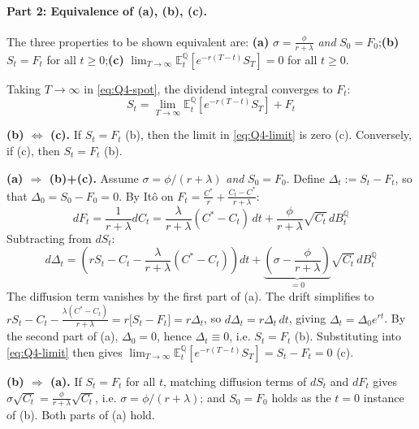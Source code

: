 \documentclass[12pt,a4paper]{article}
\begin{document}
\paragraph{Part 2: Equivalence of (a), (b), (c).}
The three properties to be shown equivalent are: \textbf{(a)} $\sigma = \frac{\phi}{r+\lambda}$ \emph{and} $S_0 = F_0$;\quad \textbf{(b)} $S_t = F_t$ for all $t \geq 0$;\quad \textbf{(c)} $\lim_{T\to\infty}\mathbb{E}^{\mathbb{Q}}_t[e^{-r(T-t)}S_T] = 0$ for all $t \geq 0$.

Taking $T \to \infty$ in \eqref{eq:Q4-spot}, the dividend integral converges to $F_t$:
\begin{equation}
    S_t = \lim_{T \to \infty} \mathbb{E}^{\mathbb{Q}}_t\!\left[ e^{-r(T-t)} S_T \right] + F_t \label{eq:Q4-limit}
\end{equation}

\noindent\textbf{(b) $\Leftrightarrow$ (c).} If $S_t = F_t$ (b), then the limit in \eqref{eq:Q4-limit} is zero (c). Conversely, if (c), then $S_t = F_t$ (b).

\noindent\textbf{(a) $\Rightarrow$ (b)+(c).} Assume $\sigma = \phi/(r+\lambda)$ \emph{and} $S_0 = F_0$. Define $\Delta_t := S_t - F_t$, so that $\Delta_0 = S_0 - F_0 = 0$. By Itô on $F_t = \frac{C^*}{r} + \frac{C_t - C^*}{r+\lambda}$:
\begin{equation*}
    dF_t = \frac{1}{r+\lambda}dC_t = \frac{\lambda}{r+\lambda}(C^* - C_t)\,dt + \frac{\phi}{r+\lambda}\sqrt{C_t}\,dB^{\mathbb{Q}}_t
\end{equation*}
Subtracting from $dS_t$:
\begin{equation*}
    d\Delta_t = \left(rS_t - C_t - \frac{\lambda}{r+\lambda}(C^* - C_t)\right)dt + \underbrace{\left(\sigma - \frac{\phi}{r+\lambda}\right)}_{=0}\sqrt{C_t}\,dB^{\mathbb{Q}}_t
\end{equation*}
The diffusion term vanishes by the first part of (a). The drift simplifies to $rS_t - C_t - \frac{\lambda(C^*-C_t)}{r+\lambda} = r\big[S_t - F_t\big] = r\Delta_t$, so $d\Delta_t = r\Delta_t\,dt$, giving $\Delta_t = \Delta_0 e^{rt}$. By the second part of (a), $\Delta_0 = 0$, hence $\Delta_t \equiv 0$, i.e. $S_t = F_t$ (b). Substituting into \eqref{eq:Q4-limit} then gives $\lim_{T\to\infty}\mathbb{E}^{\mathbb{Q}}_t[e^{-r(T-t)}S_T] = S_t - F_t = 0$ (c).

\noindent\textbf{(b) $\Rightarrow$ (a).} If $S_t = F_t$ for all $t$, matching diffusion terms of $dS_t$ and $dF_t$ gives $\sigma\sqrt{C_t} = \frac{\phi}{r+\lambda}\sqrt{C_t}$, i.e. $\sigma = \phi/(r+\lambda)$; and $S_0 = F_0$ holds as the $t=0$ instance of (b). Both parts of (a) hold.
\end{document}
